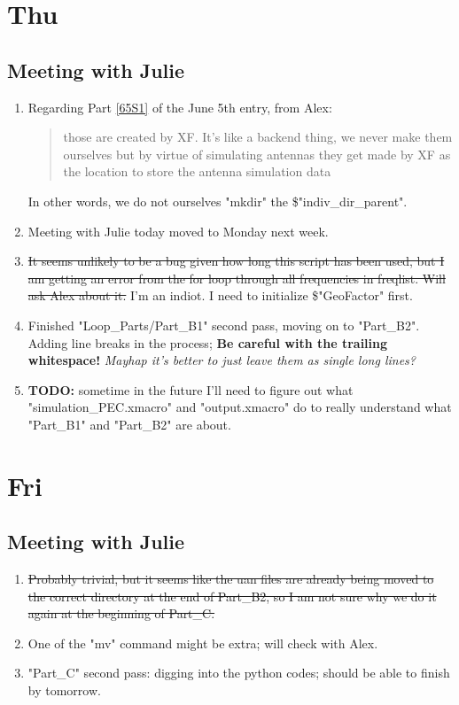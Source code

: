 \documentclass[12pt,letterpaper]{article}
\begin{document}
\section{Thu}
\subsection{Meeting with Julie}
\begin{enumerate}
  \item Regarding Part \ref{65S1} of the June 5th entry, from Alex: 
    \begin{quote}
    those are created by XF. It’s like a backend thing, we never make them
    ourselves but by virtue of simulating antennas they get made by XF as the
    location to store the antenna simulation data
    \end{quote}
    In other words, we do not ourselves "mkdir" the \$"indiv_dir_parent".

  \item Meeting with Julie today moved to Monday next week.

  \item \st{It seems unlikely to be a bug given how long this script has been used,
    but I am getting an error from the for loop through all frequencies in
    freqlist. Will ask Alex about it.}
    I'm an indiot. I need to initialize \$"GeoFactor" first.

  \item Finished "Loop_Parts/Part_B1" second pass, moving on to "Part_B2". Adding line
    breaks in the process; \textbf{Be careful with the trailing whitespace!}
    \textit{Mayhap it's better to just leave them as single long lines?}

  \item \textbf{TODO:} sometime in the future I'll need to figure out what 
    "simulation_PEC.xmacro" and "output.xmacro" do to really understand what "Part_B1" 
    and "Part_B2" are about.
\end{enumerate}

\section{Fri}
\subsection{Meeting with Julie}
\begin{enumerate}
  \item \st{Probably trivial, but it seems like the uan files are already being moved
    to the correct directory at the end of Part\_B2, so I am not sure why we do it
    again at the beginning of Part\_C.}
  \item One of the "mv" command might be extra; will check with Alex.
  \item "Part_C" second pass: digging into the python codes; should be able to finish
    by tomorrow.
\end{enumerate}
\end{document}
